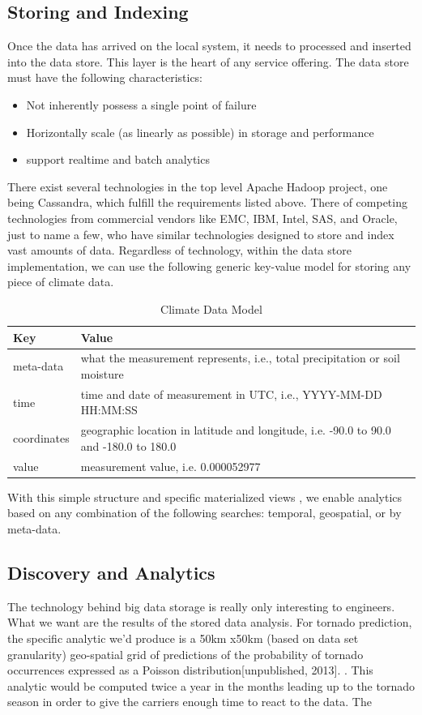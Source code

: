 \subsection*{Storing and Indexing}
Once the data has arrived on the local system, it needs to processed and inserted into the data store. This layer is the heart of any service offering. The data store must have the following characteristics:
\begin{itemize}
	\item Not inherently possess a single point of failure
	\item Horizontally scale (as linearly as possible) in storage and performance
	\item support realtime and batch analytics
\end{itemize}
There exist several technologies in the top level Apache Hadoop project, one being Cassandra, which fulfill the requirements listed above\cite{cassandra}. There of competing technologies from commercial vendors like EMC, IBM, Intel, SAS, and Oracle, just to name a few, who have similar technologies designed to store and index vast amounts of data. Regardless of technology, within the data store implementation, we can use the following generic key-value model for storing any piece of climate data.
\begin{table}[htbp]
	\caption*{Climate Data Model}
	\centering
	\begin{tabular}{l l}
		\hline
		Key & Value \\ [0.5ex]
		\hline
		meta-data & what the measurement represents, i.e., total precipitation or soil moisture\\
		time & time and date of measurement in UTC, i.e., YYYY-MM-DD HH:MM:SS\\
		coordinates & geographic location in latitude and longitude, i.e. -90.0 to 90.0 and -180.0 to 180.0\\
		value & measurement value, i.e. 0.000052977\\
		\hline
	\end{tabular}
\end{table}
With this simple structure and specific materialized views \cite{materialized_views}, we enable analytics based on any combination of the following searches: temporal, geospatial, or by meta-data.

\subsection*{Discovery and Analytics}
The technology behind big data storage is really only interesting to engineers. What we want are the results of the stored data analysis. For tornado prediction, the specific analytic we'd produce is a 50km x50km (based on data set granularity) geo-spatial grid of predictions of the probability of tornado occurrences expressed as a Poisson distribution[unpublished, 2013]. . This analytic would be computed twice a year in the months leading up to the tornado season in order to give the carriers enough time to react to the data. The \\

